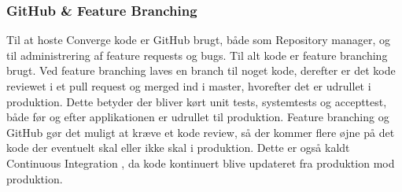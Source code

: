 
\subsubsection{GitHub \& Feature Branching}

Til at hoste Converge kode er GitHub brugt, både som Repository manager, og til administrering af feature requests og bugs. Til alt kode er feature branching brugt. Ved feature branching laves en branch til noget kode, derefter er det kode reviewet i et pull request og merged ind i master, hvorefter det er udrullet i produktion. Dette betyder der bliver kørt unit tests, systemtests og accepttest, både før og efter applikationen er udrullet til produktion. Feature branching og GitHub gør det muligt at kræve et kode review, så der kommer flere øjne på det kode der eventuelt skal eller ikke skal i produktion. Dette er også kaldt Continuous Integration , da kode kontinuert blive updateret fra produktion mod produktion.